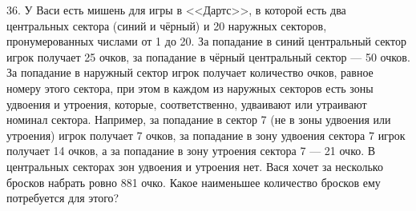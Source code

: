 36. У Васи есть мишень для игры в <<Дартс>>, в которой есть два центральных сектора (синий и чёрный) и 20 наружных секторов, пронумерованных числами от 1 до 20. За попадание в синий центральный сектор игрок получает 25 очков, за попадание в чёрный центральный сектор --- 50 очков. За попадание в наружный сектор игрок получает количество очков, равное номеру этого сектора, при этом в каждом из наружных секторов есть зоны удвоения и утроения, которые, соответственно, удваивают или утраивают номинал сектора. Например, за попадание в сектор 7 (не в зоны удвоения или утроения) игрок получает 7 очков, за попадание в зону удвоения сектора 7 игрок получает 14 очков, а за попадание в зону утроения сектора 7 --- 21 очко. В центральных секторах зон удвоения и утроения нет. Вася хочет за несколько бросков набрать ровно 881 очко. Какое наименьшее количество бросков ему потребуется для этого?\\
